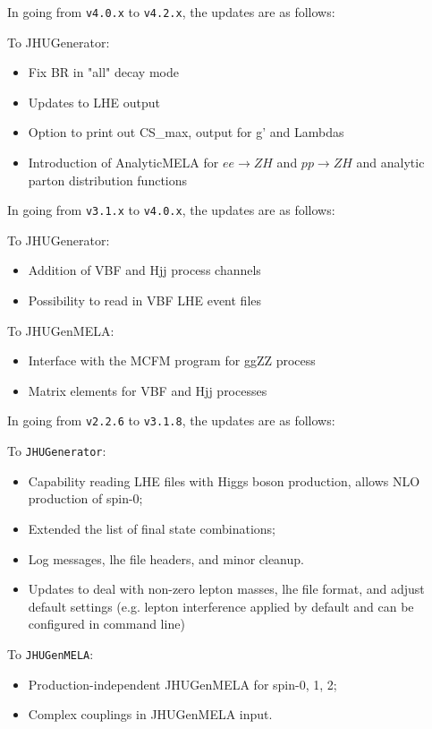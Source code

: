 \documentclass[aps,superscriptaddress,nofootinbib]{revtex4}
\begin{document}
\noindent
In going from \verb|v4.0.x| to \verb|v4.2.x|, the updates are as follows:

To JHUGenerator:
\begin{itemize}
\item Fix BR in "all" decay mode
\item Updates to LHE output
\item Option to print out CS\_max, output for g' and Lambdas
\item Introduction of AnalyticMELA for $ee \to ZH$ and $pp \to ZH$ and analytic parton distribution functions
\end{itemize}


\noindent
In going from \verb|v3.1.x| to \verb|v4.0.x|, the updates are as follows:

To JHUGenerator:
\begin{itemize}
\item Addition of VBF and Hjj process channels
\item Possibility to read in VBF LHE event files
\end{itemize}

To JHUGenMELA:
\begin{itemize}
\item Interface with the MCFM program for ggZZ process
\item Matrix elements for VBF and Hjj processes
\end{itemize}


\noindent
In going from \verb|v2.2.6| to \verb|v3.1.8|, the updates are as follows:

To \verb|JHUGenerator|:
\begin{itemize}
\item Capability reading LHE files with Higgs boson production, allows NLO production of spin-0;
\item Extended the list of final state combinations;
\item Log messages, lhe file headers, and minor cleanup.
\item Updates to deal with non-zero lepton masses, lhe file format, and adjust default settings (e.g. lepton interference applied by default and can be configured in command line)
\end{itemize}

To \verb|JHUGenMELA|:
\begin{itemize}
\item Production-independent JHUGenMELA for spin-0, 1, 2;
\item Complex couplings in JHUGenMELA input.
\end{itemize}
\end{document}
